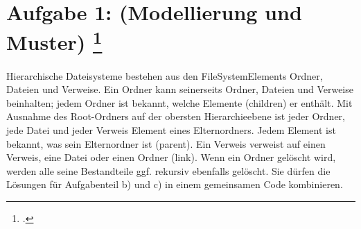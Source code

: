 \documentclass{lehramt-informatik-aufgabe}
\begin{document}
\section{Aufgabe 1: (Modellierung und Muster)
\footcite{66116:2019:09}}

Hierarchische Dateisysteme bestehen aus den FileSystemElements Ordner,
Dateien und Verweise. Ein Ordner kann seinerseits Ordner, Dateien und
Verweise beinhalten; jedem Ordner ist bekannt, welche Elemente
(children) er enthält. Mit Ausnahme des Root-Ordners auf der obersten
Hierarchieebene ist jeder Ordner, jede Datei und jeder Verweis Element
eines Elternordners. Jedem Element ist bekannt, was sein Elternordner
ist (parent). Ein Verweis verweist auf einen Verweis, eine Datei oder
einen Ordner (link). Wenn ein Ordner gelöscht wird, werden alle seine
Bestandteile ggf. rekursiv ebenfalls gelöscht. Sie dürfen die Lösungen
für Aufgabenteil b) und c) in einem gemeinsamen Code kombinieren.
\end{document}
